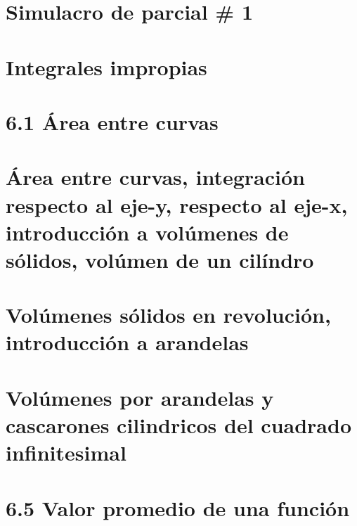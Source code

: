 \documentclass{book}
\begin{document}
\chapter{Simulacro de parcial \# 1} 

\chapter{Integrales impropias} 

\chapter{6.1 Área entre curvas} 

\chapter{Área entre curvas, integración respecto al eje-y, respecto al eje-x, introducción a volúmenes de sólidos, volúmen de un cilíndro} 

\chapter{Volúmenes sólidos en revolución, introducción a arandelas} 

\chapter{Volúmenes por arandelas y cascarones cilindricos del cuadrado infinitesimal} 

\chapter{6.5 Valor promedio de una función } 

\end{document}
